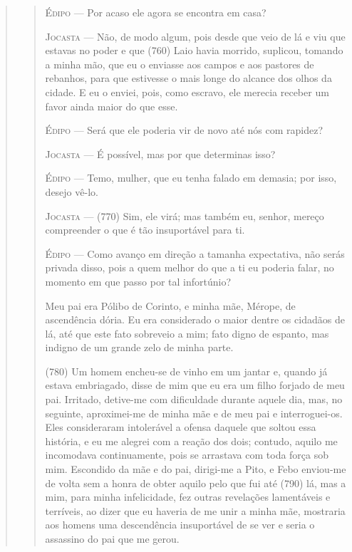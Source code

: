 \begin{verse}
\begin{verse}
\textsc{Édipo} --- Por acaso ele agora se encontra em casa?

\textsc{Jocasta} --- Não, de modo algum, pois desde que veio de lá e viu que estavas no poder
e que (760) Laio havia morrido, suplicou, tomando a minha mão, que eu o
enviasse aos campos e aos pastores de rebanhos, para que estivesse o
mais longe do alcance dos olhos da cidade. E eu o enviei, pois, como
escravo, ele merecia receber um favor ainda maior do que esse.

\textsc{Édipo} --- Será que ele poderia vir de novo até nós com rapidez?

\textsc{Jocasta} --- É possível, mas por que determinas isso?

\textsc{Édipo} --- Temo, mulher, que eu tenha falado em demasia; por isso, desejo vê-lo.

\textsc{Jocasta} --- (770) Sim, ele virá; mas também eu, senhor, mereço compreender o que é
tão insuportável para ti.

\textsc{Édipo} --- Como avanço em direção a tamanha expectativa, não serás privada disso,
pois a quem melhor do que a ti eu poderia falar, no momento em que passo
por tal infortúnio?

Meu pai era Pólibo de Corinto, e minha mãe, Mérope, de ascendência
dória. Eu era considerado o maior dentre os cidadãos de lá, até que este
fato sobreveio a mim; fato digno de espanto, mas indigno de um grande
zelo de minha parte.

(780) Um homem encheu-se de vinho em um jantar e, quando já estava
embriagado, disse de mim que eu era um filho forjado de meu pai.
Irritado, detive-me com dificuldade durante aquele dia, mas, no
seguinte, aproximei-me de minha mãe e de meu pai e interroguei-os. Eles
consideraram intolerável a ofensa daquele que soltou essa história, e eu
me alegrei com a reação dos dois; contudo, aquilo me incomodava
continuamente, pois se arrastava com toda força sob mim. Escondido da
mãe e do pai, dirigi-me a Pito, e Febo enviou-me de volta sem a honra de
obter aquilo pelo que fui até (790) lá, mas a mim, para minha
infelicidade, fez outras revelações lamentáveis e terríveis, ao dizer
que eu haveria de me unir a minha mãe, mostraria aos homens uma
descendência insuportável de se ver e seria o assassino do pai que me
gerou.


\end{verse}
\end{verse}
